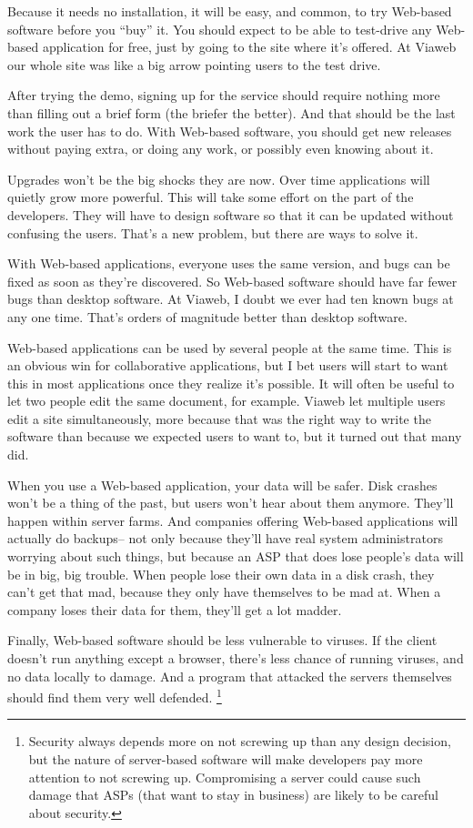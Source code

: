 Because it needs no installation, it will be easy, and common, to try
Web-based software before you ``buy'' it. You should expect to be able
to test-drive any Web-based application for free, just by going to the
site where it's offered. At Viaweb our whole site was like a big arrow
pointing users to the test drive.

After trying the demo, signing up for the service should require nothing
more than filling out a brief form (the briefer the better). And that
should be the last work the user has to do. With Web-based software, you
should get new releases without paying extra, or doing any work, or
possibly even knowing about it.

Upgrades won't be the big shocks they are now. Over time applications
will quietly grow more powerful. This will take some effort on the part
of the developers. They will have to design software so that it can be
updated without confusing the users. That's a new problem, but there are
ways to solve it.

With Web-based applications, everyone uses the same version, and bugs
can be fixed as soon as they're discovered. So Web-based software should
have far fewer bugs than desktop software. At Viaweb, I doubt we ever
had ten known bugs at any one time. That's orders of magnitude better
than desktop software.

Web-based applications can be used by several people at the same time.
This is an obvious win for collaborative applications, but I bet users
will start to want this in most applications once they realize it's
possible. It will often be useful to let two people edit the same
document, for example. Viaweb let multiple users edit a site
simultaneously, more because that was the right way to write the
software than because we expected users to want to, but it turned out
that many did.

When you use a Web-based application, your data will be safer. Disk
crashes won't be a thing of the past, but users won't hear about them
anymore. They'll happen within server farms. And companies offering
Web-based applications will actually do backups-- not only because
they'll have real system administrators worrying about such things, but
because an ASP that does lose people's data will be in big, big trouble.
When people lose their own data in a disk crash, they can't get that
mad, because they only have themselves to be mad at. When a company
loses their data for them, they'll get a lot madder.

Finally, Web-based software should be less vulnerable to viruses. If the
client doesn't run anything except a browser, there's less chance of
running viruses, and no data locally to damage. And a program that
attacked the servers themselves should find them very well defended.
\footnote{Security always depends more on not screwing up than any design
decision, but the nature of server-based software will make developers
pay more attention to not screwing up. Compromising a server could cause
such damage that ASPs (that want to stay in business) are likely to be
careful about security.}

